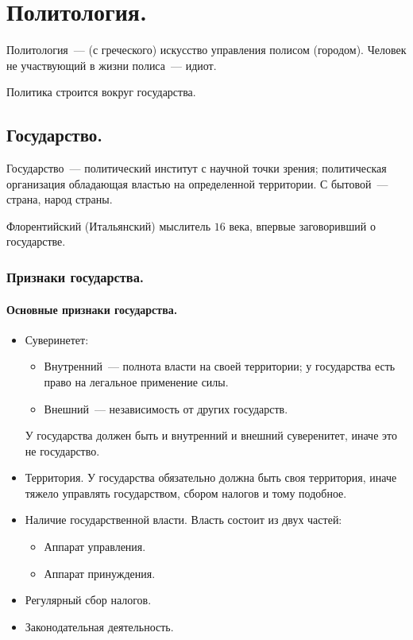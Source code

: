 \documentclass[12pt]{article}
\begin{document}
	\tableofcontents
	\setcounter{tocdepth}{4}
	\newpage
	\section{Политология.}
	\begin{definition}
		Политология~--- (с греческого) искусство управления полисом (городом). Человек не участвующий в жизни полиса~--- идиот.
	\end{definition}
	\noindent
	Политика строится вокруг государства.
	\subsection{Государство.}
	\begin{definition}
		Государство~--- политический институт с научной точки зрения; политическая организация обладающая властью на определенной территории. С бытовой~--- страна, народ страны.
	\end{definition}
	\begin{person}
		Флорентийский (Итальянский) мыслитель $16$ века, впервые заговоривший о государстве.
	\end{person}
	\subsubsection{Признаки государства.}
	\paragraph{Основные признаки государства.}
	\begin{itemize}
		\item Суверинетет:
		\begin{itemize}
			\item Внутренний~--- полнота власти на своей территории; у государства есть право на легальное применение силы.
			\item Внешний~--- независимость от других государств.
		\end{itemize}
		У государства должен быть и внутренний и внешний суверенитет, иначе это не государство.
		\item Территория. У государства обязательно должна быть своя территория, иначе тяжело управлять государством, сбором налогов и тому подобное.
		\item Наличие государственной власти. Власть состоит из двух частей:
		\begin{itemize}
			\item Аппарат управления.
			\item Аппарат принуждения.
		\end{itemize}
		\item Регулярный сбор налогов.
		\item Законодательная деятельность.
	\end{itemize}
\end{document}
